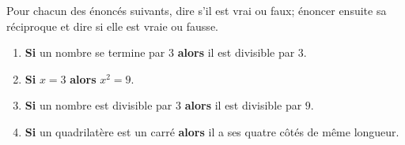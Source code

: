 
\begin{exercice}\label{exosmath-0784}

Pour chacun des énoncés suivants, dire s'il est vrai ou faux; énoncer ensuite sa réciproque et dire si elle est vraie ou fausse.
\begin{enumerate}
    \item
        {\bf Si} un nombre se termine par $3$ {\bf alors} il est divisible par $3$.
\item
    {\bf Si} $x = 3$ {\bf alors} $x^2 = 9$.
\item
    {\bf Si} un nombre est divisible par $3$ {\bf alors} il est divisible par $9$.
\item
    {\bf Si} un quadrilatère est un carré {\bf alors} il a ses quatre côtés de même longueur.
\end{enumerate}

\end{exercice}
